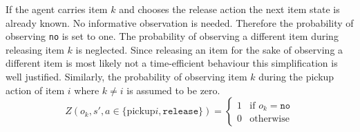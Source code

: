 If the agent carries item $k$ and chooses the release action the next item state is already known. No informative observation is needed. Therefore the probability of observing \texttt{no} is set to one. The probability of observing a different item during releasing item $k$ is neglected. Since releasing an item for the sake of observing a different item is most likely not a time-efficient behaviour this simplification is well justified. Similarly, the probability of observing item $k$ during the pickup action of item $i$ where $k\neq i$ is assumed to be zero. 
\begin{equation}\label{eq:Orelease}
    Z(o_k, s', a\in\{\text{pickup}i, \texttt{release}\}) = \begin{cases}
    1& \text{if } o_k=\texttt{no}\\
    0& \text{otherwise}\end{cases}
\end{equation}
